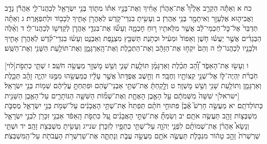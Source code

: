 \documentclass[twoside, openany, parskip=half, 11pt]{book}
\begin{document}
כח א וְאַתָּ֡ה הַקְרֵ֣ב אֵלֶ֩יךָ֩ אֶת־אַהֲרֹ֨ן אָחִ֜יךָ וְאֶת־בָּנָ֣יו אִתּ֗וֹ מִתּ֛וֹךְ בְּנֵ֥י יִשְׂרָאֵ֖ל לְכַהֲנוֹ־לִ֑י אַהֲרֹ֕ן נָדָ֧ב וַאֲבִיה֛וּא אֶלְעָזָ֥ר וְאִיתָמָ֖ר בְּנֵ֥י אַהֲרֹֽן׃ ב וְעָשִׂ֥יתָ בִגְדֵי־קֹ֖דֶשׁ לְאַהֲרֹ֣ן אָחִ֑יךָ לְכָב֖וֹד וּלְתִפְאָֽרֶת׃ ג וְאַתָּ֗ה תְּדַבֵּר֙ אֶל־כׇּל־חַכְמֵי־לֵ֔ב אֲשֶׁ֥ר מִלֵּאתִ֖יו ר֣וּחַ חׇכְמָ֑ה וְעָשׂ֞וּ אֶת־בִּגְדֵ֧י אַהֲרֹ֛ן לְקַדְּשׁ֖וֹ לְכַהֲנוֹ־לִֽי׃ ד וְאֵ֨לֶּה הַבְּגָדִ֜ים אֲשֶׁ֣ר יַעֲשׂ֗וּ חֹ֤שֶׁן וְאֵפוֹד֙ וּמְעִ֔יל וּכְתֹ֥נֶת תַּשְׁבֵּ֖ץ מִצְנֶ֣פֶת וְאַבְנֵ֑ט וְעָשׂ֨וּ בִגְדֵי־קֹ֜דֶשׁ לְאַהֲרֹ֥ן אָחִ֛יךָ וּלְבָנָ֖יו לְכַהֲנוֹ־לִֽי׃ ה וְהֵם֙ יִקְח֣וּ אֶת־הַזָּהָ֔ב וְאֶת־הַתְּכֵ֖לֶת וְאֶת־הָֽאַרְגָּמָ֑ן וְאֶת־תּוֹלַ֥עַת הַשָּׁנִ֖י וְאֶת־הַשֵּֽׁשׁ׃

[לוי]ו וְעָשׂ֖וּ אֶת־הָאֵפֹ֑ד זָ֠הָ֠ב תְּכֵ֨לֶת וְאַרְגָּמָ֜ן תּוֹלַ֧עַת שָׁנִ֛י וְשֵׁ֥שׁ מׇשְׁזָ֖ר מַעֲשֵׂ֥ה חֹשֵֽׁב׃ ז שְׁתֵּ֧י כְתֵפֹ֣ת חֹֽבְרֹ֗ת יִֽהְיֶה־לּ֛וֹ אֶל־שְׁנֵ֥י קְצוֹתָ֖יו וְחֻבָּֽר׃ ח וְחֵ֤שֶׁב אֲפֻדָּתוֹ֙ אֲשֶׁ֣ר עָלָ֔יו כְּמַעֲשֵׂ֖הוּ מִמֶּ֣נּוּ יִהְיֶ֑ה זָהָ֗ב תְּכֵ֧לֶת וְאַרְגָּמָ֛ן וְתוֹלַ֥עַת שָׁנִ֖י וְשֵׁ֥שׁ מׇשְׁזָֽר׃ ט וְלָ֣קַחְתָּ֔ אֶת־שְׁתֵּ֖י אַבְנֵי־שֹׁ֑הַם וּפִתַּחְתָּ֣ עֲלֵיהֶ֔ם שְׁמ֖וֹת בְּנֵ֥י יִשְׂרָאֵֽל׃ [ישראל]י שִׁשָּׁה֙ מִשְּׁמֹתָ֔ם עַ֖ל הָאֶ֣בֶן הָאֶחָ֑ת וְאֶת־שְׁמ֞וֹת הַשִּׁשָּׁ֧ה הַנּוֹתָרִ֛ים עַל־הָאֶ֥בֶן הַשֵּׁנִ֖ית כְּתוֹלְדֹתָֽם׃ יא מַעֲשֵׂ֣ה חָרַשׁ֮ אֶ֒בֶן֒ פִּתּוּחֵ֣י חֹתָ֗ם תְּפַתַּח֙ אֶת־שְׁתֵּ֣י הָאֲבָנִ֔ים עַל־שְׁמֹ֖ת בְּנֵ֣י יִשְׂרָאֵ֑ל מֻסַבֹּ֛ת מִשְׁבְּצ֥וֹת זָהָ֖ב תַּעֲשֶׂ֥ה אֹתָֽם׃ יב וְשַׂמְתָּ֞ אֶת־שְׁתֵּ֣י הָאֲבָנִ֗ים עַ֚ל כִּתְפֹ֣ת הָֽאֵפֹ֔ד אַבְנֵ֥י זִכָּרֹ֖ן לִבְנֵ֣י יִשְׂרָאֵ֑ל וְנָשָׂא֩ אַהֲרֹ֨ן אֶת־שְׁמוֹתָ֜ם לִפְנֵ֧י יְהֹוָ֛ה עַל־שְׁתֵּ֥י כְתֵפָ֖יו לְזִכָּרֹֽן׃
שנייג וְעָשִׂ֥יתָ מִשְׁבְּצֹ֖ת זָהָֽב׃ יד וּשְׁתֵּ֤י שַׁרְשְׁרֹת֙ זָהָ֣ב טָה֔וֹר מִגְבָּלֹ֛ת תַּעֲשֶׂ֥ה אֹתָ֖ם מַעֲשֵׂ֣ה עֲבֹ֑ת וְנָתַתָּ֛ה אֶת־שַׁרְשְׁרֹ֥ת הָעֲבֹתֹ֖ת עַל־הַֽמִּשְׁבְּצֹֽת׃
\end{document}
